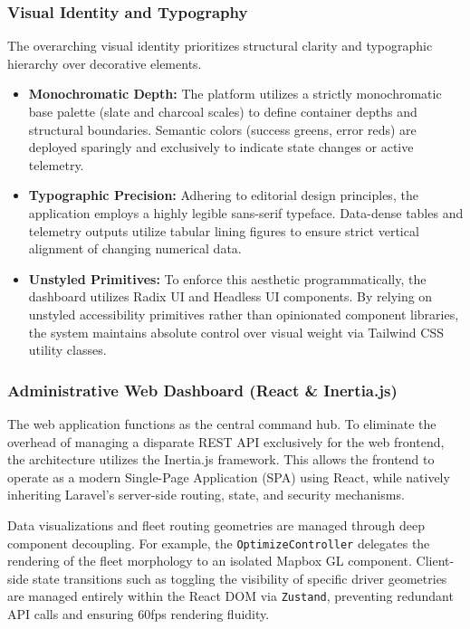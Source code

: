 \documentclass[a4paper]{report}
\begin{document}
{\begin{itemize}
\begin{itemize}
\subsubsection{Visual Identity and Typography}
The overarching visual identity prioritizes structural clarity and typographic hierarchy over decorative elements. 
\begin{itemize}
    \item \textbf{Monochromatic Depth:} The platform utilizes a strictly monochromatic base palette (slate and charcoal scales) to define container depths and structural boundaries. Semantic colors (success greens, error reds) are deployed sparingly and exclusively to indicate state changes or active telemetry.
    \item \textbf{Typographic Precision:} Adhering to editorial design principles, the application employs a highly legible sans-serif typeface. Data-dense tables and telemetry outputs utilize tabular lining figures to ensure strict vertical alignment of changing numerical data.
    \item \textbf{Unstyled Primitives:} To enforce this aesthetic programmatically, the dashboard utilizes Radix UI and Headless UI components. By relying on unstyled accessibility primitives rather than opinionated component libraries, the system maintains absolute control over visual weight via Tailwind CSS utility classes.
\end{itemize}

\subsubsection{Administrative Web Dashboard (React \& Inertia.js)}
The web application functions as the central command hub. To eliminate the overhead of managing a disparate REST API exclusively for the web frontend, the architecture utilizes the Inertia.js framework. This allows the frontend to operate as a modern Single-Page Application (SPA) using React, while natively inheriting Laravel's server-side routing, state, and security mechanisms.

Data visualizations and fleet routing geometries are managed through deep component decoupling. For example, the \texttt{OptimizeController} delegates the rendering of the fleet morphology to an isolated Mapbox GL component. Client-side state transitions such as toggling the visibility of specific driver geometries are managed entirely within the React DOM via \texttt{Zustand}, preventing redundant API calls and ensuring 60fps rendering fluidity.


\end{itemize}
\end{itemize}}
\end{document}
